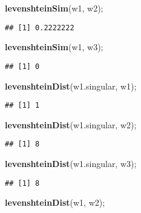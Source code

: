 \documentclass[
]{article}
\newenvironment{Shaded}{\begin{snugshade}}{\end{snugshade}}
\newcommand{\KeywordTok}[1]{\textcolor[rgb]{0.13,0.29,0.53}{\textbf{#1}}}
\newcommand{\NormalTok}[1]{#1}
\begin{document}
\begin{Shaded}
\begin{Highlighting}[]
\KeywordTok{levenshteinSim}\NormalTok{(w1, w2);}
\end{Highlighting}
\end{Shaded}

\begin{verbatim}
## [1] 0.2222222
\end{verbatim}

\begin{Shaded}
\begin{Highlighting}[]
\KeywordTok{levenshteinSim}\NormalTok{(w1, w3);}
\end{Highlighting}
\end{Shaded}

\begin{verbatim}
## [1] 0
\end{verbatim}

\begin{Shaded}
\begin{Highlighting}[]
\KeywordTok{levenshteinDist}\NormalTok{(w1.singular, w1);}
\end{Highlighting}
\end{Shaded}

\begin{verbatim}
## [1] 1
\end{verbatim}

\begin{Shaded}
\begin{Highlighting}[]
\KeywordTok{levenshteinDist}\NormalTok{(w1.singular, w2);}
\end{Highlighting}
\end{Shaded}

\begin{verbatim}
## [1] 8
\end{verbatim}

\begin{Shaded}
\begin{Highlighting}[]
\KeywordTok{levenshteinDist}\NormalTok{(w1.singular, w3);}
\end{Highlighting}
\end{Shaded}

\begin{verbatim}
## [1] 8
\end{verbatim}

\begin{Shaded}
\begin{Highlighting}[]
\KeywordTok{levenshteinDist}\NormalTok{(w1, w2);}
\end{Highlighting}
\end{Shaded}
\end{document}
